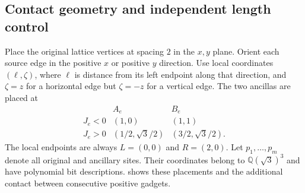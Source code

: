 \subsection{Contact geometry and independent length control}

Place the original lattice vertices at spacing $2$ in the $x,y$ plane.
Orient each source edge in the positive $x$ or positive $y$ direction.
Use local coordinates $(\ell,\zeta)$, where $\ell$ is distance from its
left endpoint along that direction, and $\zeta=z$ for a horizontal edge
but $\zeta=-z$ for a vertical edge.  The two ancillas are placed at
\begin{equation}\label{eq:gadget-coordinates}
 \begin{array}{c|cc}
       & A_e & B_e\\ \hline
 J_e<0 &(1,0)&(1,1)\\[2pt]
 J_e>0 &(1/2,\sqrt3/2)&(3/2,\sqrt3/2).
 \end{array}
\end{equation}
The local endpoints are always $L=(0,0)$ and $R=(2,0)$.
Let $p_1,\ldots,p_m$ denote all original and ancillary sites.
Their coordinates belong to $\mathbb Q(\sqrt3)^3$ and have polynomial
bit descriptions.
 shows these placements and the additional contact
between consecutive positive gadgets.

